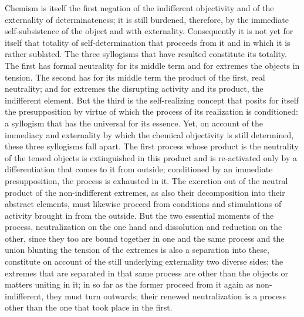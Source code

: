 Chemism is itself the first negation
of the indifferent objectivity
and of the externality of determinateness;
it is still burdened, therefore,
by the immediate self-subsistence
of the object and with externality.
Consequently it is not yet for itself
that totality of self-determination
that proceeds from it
and in which it is rather sublated.
The three syllogisms that have resulted
constitute its totality.
The first has formal neutrality
for its middle term and
for extremes the objects in tension.
The second has for its middle term the
product of the first, real neutrality;
and for extremes the disrupting activity
and its product, the indifferent element.
But the third is the self-realizing concept
that posits for itself the presupposition
by virtue of which the process of its
realization is conditioned:
a syllogism that has the universal for its essence.
Yet, on account of the immediacy and externality
by which the chemical objectivity is still determined,
these three syllogisms fall apart.
The first process whose product is
the neutrality of the tensed objects is
extinguished in this product
and is re-activated only by
a differentiation that comes to it from outside;
conditioned by an immediate presupposition,
the process is exhausted in it.
The excretion out of the neutral product
of the non-indifferent extremes,
as also their decomposition into their abstract elements,
must likewise proceed from conditions and
stimulations of activity brought in from the outside.
But the two essential moments of the process,
neutralization on the one hand
and dissolution and reduction on the other,
since they too are bound together
in one and the same process
and the union blunting the tension of the extremes is
also a separation into these,
constitute on account of the still underlying
externality two diverse sides;
the extremes that are separated in that same process
are other than the objects or matters uniting in it;
in so far as the former proceed from it again
as non-indifferent, they must turn outwards;
their renewed neutralization is a process other
than the one that took place in the first.

